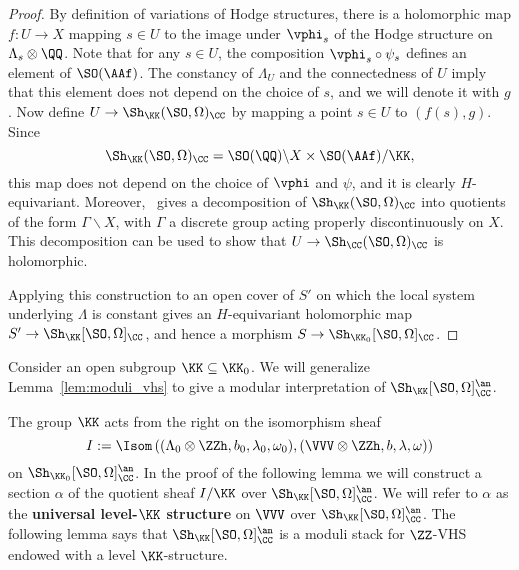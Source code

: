 \begin{proof}
By definition of variations of Hodge structures, there is a holomorphic map $f\colon U \rightarrow X$ mapping $s \in U$ to the image under $\vphi_s$ of the Hodge structure on $\Lambda_s \otimes \QQ$. Note that for any $s \in U$, the composition $\vphi_s \circ \psi_s$ defines an element of $\SO(\AAf)$. The constancy of $\Lambda_U$ and the connectedness of $U$ imply that this element does not depend on the choice of $s$, and we will denote it with $g$. Now define $U \rightarrow \Sh_{\KK}(\SO,\Omega)_{\CC}$ by mapping a point $s \in U$ to $(f(s), g)$. Since
$$
\Sh_{\KK}(\SO,\Omega)_{\CC} = \SO(\QQ) \backslash X \times \SO(\AAf) / \KK,
$$
this map does not depend on the choice of $\vphi$ and $\psi$, and it is clearly $H$-equivariant. Moreover,~\cite[Lemma~5.13]{MilneShimura} gives a decomposition of $\Sh_{\KK}(\SO,\Omega)_{\CC}$ into quotients of the form $\Gamma \backslash X$, with $\Gamma$ a discrete group acting properly discontinuously on $X$. This decomposition can be used to show that $U \rightarrow \Sh_{\CC}(\SO,\Omega)_{\CC}$ is holomorphic.

Applying this construction to an open cover of $S'$ on which the local system underlying $\Lambda$ is constant gives an $H$-equivariant holomorphic map $S' \rightarrow \Sh_{\KK}[\SO,\Omega]_{\CC}$, and hence a morphism $S \rightarrow \Sh_{\KK_0}[\SO,\Omega]_{\CC}$.
\end{proof}

Consider an open subgroup $\KK \subseteq \KK_0$. We will generalize Lemma~\ref{lem:moduli_vhs} to give a modular interpretation of $\Sh_{\KK}[\SO,\Omega]_{\CC}^{\an}$.

The group $\KK$ acts from the right on the isomorphism sheaf
$$
I := \Isom\left((\Lambda_0 \otimes \ZZh,b_0,\lambda_0,\omega_0),(\VVV \otimes \ZZh,b,\lambda,\omega)\right)
$$
on $\Sh_{\KK_0}[\SO,\Omega]_{\CC}^{\an}$. In the proof of the following lemma we will construct a section $\alpha$ of the quotient sheaf $I/\KK$ over $\Sh_{\KK}[\SO,\Omega]_{\CC}^{\an}$. We will refer to $\alpha$ as the {\bfseries universal level-$\KK$ structure} on $\VVV$ over $\Sh_{\KK}[\SO,\Omega]_{\CC}^{\an}$. The following lemma says that $\Sh_{\KK}[\SO,\Omega]_{\CC}^{\an}$ is a moduli stack for $\ZZ$-VHS endowed with a level $\KK$-structure.

